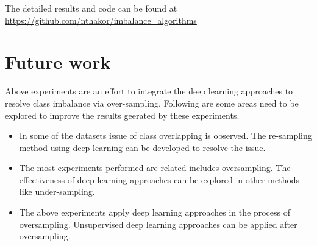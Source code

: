 \documentclass[a4paper,11pt]{report}
\begin{document}
The detailed results and code can be found at \url{https://github.com/nthakor/imbalance_algorithms}


\section*{Future work}

Above experiments are an effort to integrate the deep learning approaches to resolve class imbalance via over-sampling. Following are some areas need to be explored to improve the results geerated by these experiments.

\begin{itemize}
    \item {In some of the datasets issue of class overlapping is observed. The re-sampling method using deep learning can be developed to resolve the issue.}
    \item{The most experiments performed are related includes oversampling. The effectiveness of deep learning approaches can be explored in other methods like under-sampling. }
    \item{The above experiments apply deep learning approaches in the process of oversampling. Unsupervised deep learning approaches can be applied after oversampling.}
\end{itemize}





\end{document}

